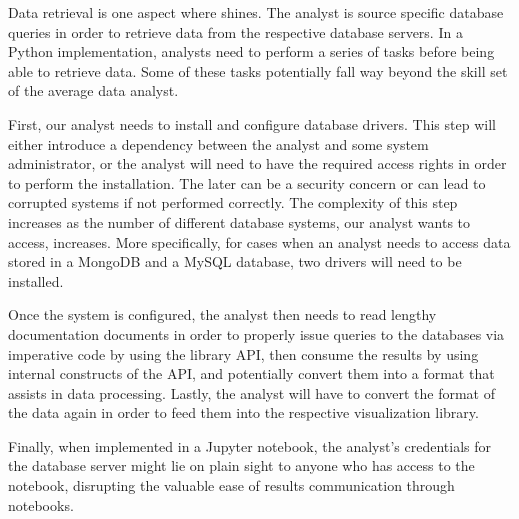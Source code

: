


Data retrieval is one aspect where {\projname} shines. The analyst is source specific database queries in order to retrieve data from the respective database servers. In a Python implementation, analysts need to perform a series of tasks before being able to retrieve data. Some of these tasks potentially fall way beyond the skill set of the average data analyst. 




First, our analyst needs to install and configure database drivers. This step will either introduce a dependency between the analyst and some system administrator, or the analyst will need to have the required access rights in order to perform the installation. The later can be a security concern or can lead to corrupted systems if not performed correctly. The complexity of this step increases as the number of different database systems, our analyst wants to access, increases. More specifically, for cases when an analyst needs to access data stored in a MongoDB and a MySQL database, two drivers will need to be installed.

Once the system is configured, the analyst then needs to read lengthy documentation documents in order to properly issue queries to the databases via imperative code by using the library API, then consume the results by using internal constructs of the API, and potentially convert them into a format that assists in data processing. Lastly, the analyst will have to convert the format of the data again in order to feed them into the respective visualization library.

Finally, when implemented in a Jupyter notebook, the analyst's credentials for the database server might lie on plain sight to anyone who has access to the notebook, disrupting the valuable ease of results communication through notebooks.

